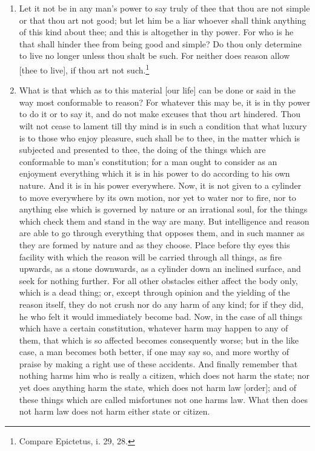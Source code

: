 \begin{enumerate}
\item Let it not be in any man's power to say truly of thee that thou are not simple or that thou art not good; but let him be a liar whoever shall think anything of this kind about thee; and this is altogether in thy power. For who is he that shall hinder thee from being good and simple? Do thou only determine to live no longer unless thou shalt be such. For neither does reason allow [{\clarify thee to live}], if thou art not such.\footnote{Compare Epictetus, i. 29, 28.}

\item What is that which as to this material [{\clarify our life}] can be done or said in the way most conformable to reason? For whatever this may be, it is in thy power to do it or to say it, and do not make excuses that thou art hindered. Thou wilt not cease to lament till thy mind is in such a condition that what luxury is to those who enjoy pleasure, such shall be to thee, in the matter which is subjected and presented to thee, the doing of the things which are conformable to man's constitution; for a man ought to consider as an enjoyment everything which it is in his power to do according to his own nature. And it is in his power everywhere. Now, it is not given to a cylinder to move everywhere by its own motion, nor yet to water nor to fire, nor to anything else which is governed by nature or an irrational soul, for the things which check them and stand in the way are many. But intelligence and reason are able to go through everything that opposes them, and in such manner as they are formed by nature and as they choose. Place before thy eyes this facility with which the reason will be carried through all things, as fire upwards, as a stone downwards, as a cylinder down an inclined surface, and seek for nothing further. For all other obstacles either affect the body only, which is a dead thing; or, except through opinion and the yielding of the reason itself, they do not crush nor do any harm of any kind; for if they did, he who felt it would immediately become bad. Now, in the case of all things which have a certain constitution, whatever harm may happen to any of them, that which is so affected becomes consequently worse; but in the like case, a man becomes both better, if one may say so, and more worthy of praise by making a right use of these accidents. And finally remember that nothing harms him who is really a citizen, which does not harm the state; nor yet does anything harm the state, which does not harm law [{\clarify order}]; and of these things which are called misfortunes not one harms law. What then does not harm law does not harm either state or citizen.


\end{enumerate}
